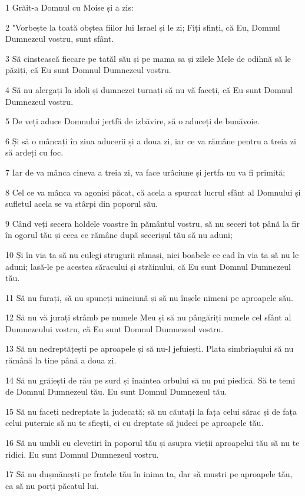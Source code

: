 \par 1 Grăit-a Domnul cu Moise și a zis:
\par 2 "Vorbește la toată obștea fiilor lui Israel și le zi; Fiți sfinți, că Eu, Domnul Dumnezeul vostru, sunt sfânt.
\par 3 Să cinstească fiecare pe tatăl său și pe mama sa și zilele Mele de odihnă să le păziți, că Eu sunt Domnul Dumnezeul vostru.
\par 4 Să nu alergați la idoli și dumnezei turnați să nu vă faceți, că Eu sunt Domnul Dumnezeul vostru.
\par 5 De veți aduce Domnului jertfă de izbăvire, să o aduceți de bunăvoie.
\par 6 Și să o mâncați în ziua aducerii și a doua zi, iar ce va rămâne pentru a treia zi să ardeți cu foc.
\par 7 Iar de va mânca cineva a treia zi, va face urâciune și jertfa nu va fi primită;
\par 8 Cel ce va mânca va agonisi păcat, că acela a spurcat lucrul sfânt al Domnului și sufletul acela se va stârpi din poporul său.
\par 9 Când veți secera holdele voastre în pământul vostru, să nu seceri tot până la fir în ogorul tău și ceea ce rămâne după secerișul tău să nu aduni;
\par 10 Și în via ta să nu culegi strugurii rămași, nici boabele ce cad în via ta să nu le aduni; lasă-le pe acestea săracului și străinului, că Eu sunt Domnul Dumnezeul tău.
\par 11 Să nu furați, să nu spuneți minciună și să nu înșele nimeni pe aproapele său.
\par 12 Să nu vă jurați strâmb pe numele Meu și să nu pângăriți numele cel sfânt al Dumnezeului vostru, că Eu sunt Domnul Dumnezeul vostru.
\par 13 Să nu nedreptățești pe aproapele și să nu-l jefuiești. Plata simbriașului să nu rămână la tine până a doua zi.
\par 14 Să nu grăiești de rău pe surd și înaintea orbului să nu pui piedică. Să te temi de Domnul Dumnezeul tău. Eu sunt Domnul Dumnezeul tău.
\par 15 Să nu faceți nedreptate la judecată; să nu căutați la fața celui sărac și de fața celui puternic să nu te sfiești, ci cu dreptate să judeci pe aproapele tău.
\par 16 Să nu umbli cu clevetiri în poporul tău și asupra vieții aproapelui tău să nu te ridici. Eu sunt Domnul Dumnezeul vostru.
\par 17 Să nu dușmănești pe fratele tău în inima ta, dar să mustri pe aproapele tău, ca să nu porți păcatul lui.
